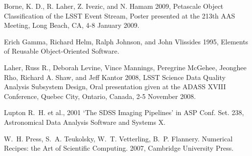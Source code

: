 \begin{thebibliography}{}

 Borne, K. D., R. Laher, Z. Ivezic, and N. Hamam 2009,
   Petascale Object Classification of the LSST Event Stream, 
   Poster presented at the 213th AAS Meeting, Long Beach, CA, 4-8 January 2009.

Erich Gamma, Richard Helm, Ralph Johnson, and John Vlissides 1995,
Elements of Reusable Object-Oriented Software.

 Laher, Russ R., Deborah Levine, Vince Mannings, 
   Peregrine McGehee, Jeonghee Rho, Richard A. Shaw, and Jeff Kantor 2008,
   LSST Science Data Quality Analysis Subsystem Design,
   Oral presentation given at the ADASS XVIII Conference, Quebec City, Ontario, Canada, 
   2-5 November 2008.

Lupton R.~H. et al., 2001 `The SDSS Imaging Pipelines' in
ASP Conf. Set. 238, Astronomical Data Analysis Software and Systems X.
   
  W.~H. Press,  S.~A. Teukolsky, W.~T. Vetterling, B.~P. Flannery.
  Numerical Recipes: the Art of Scientific Computing.
  2007, Cambridge University Press.
   
\end{thebibliography}

